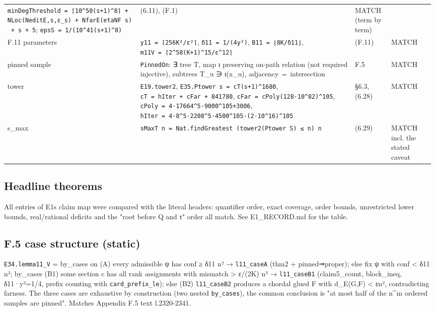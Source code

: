 \documentclass[
]{article}
\begin{document}
{\begin{longtable}[]{@{}llll@{}}
\texttt{minDegThreshold\ =\ ⌈10\^{}50(s+1)\^{}8⌉\ +\ NLoc(NeditE,s,ε\_s)\ +\ NfarE(etaNF\ s)\ +\ s\ +\ 5};
\texttt{epsS\ =\ 1/(10\^{}41(s+1)\^{}8)} & (6.11), (F.1) & MATCH (term
by term) \\
F.11 parameters & \texttt{y11\ =\ ⌈256K²/ε²⌉}, \texttt{δ11\ =\ 1/(4y²)},
\texttt{B11\ =\ ⌊8K/δ11⌋},
\texttt{m11V\ =\ ⌈2\^{}58(K+1)\^{}15/ε\^{}12⌉} & (F.11) & MATCH \\
pinned sample & \texttt{PinnedOn}: ∃ tree T, map ι preserving on-path
relation (not required injective), subtrees T\_u ∋ ι(x\_u), adjacency ⇔
intersection & F.5 & MATCH \\
tower & \texttt{E19.tower2}, \texttt{E35.Ptower\ s\ =\ cT(s+1)\^{}1680},
\texttt{cT\ =\ hIter\ +\ cFar\ +\ 841780},
\texttt{cFar\ =\ cPoly(128·10\^{}82)\^{}105},
\texttt{cPoly\ =\ 4·17664\^{}5·9000\^{}105+3006},
\texttt{hIter\ =\ 4·8\^{}5·2208\^{}5·4500\^{}105·(2·10\^{}16)\^{}105} &
§6.3, (6.28) & MATCH \\
s\_max &
\texttt{sMaxT\ n\ =\ Nat.findGreatest\ (tower2(Ptower\ S)\ ≤\ n)\ n} &
(6.29) & MATCH incl. the stated caveat \\
\end{longtable}
}

\subsection{Headline theorems}\label{headline-theorems}

All entries of E1\textquotesingle s claim map were compared with the
literal headers: quantifier order, exact coverage, order bounds,
unrestricted lower bounds, real/rational deficits and the "root before Q
and τ" order all match. See E1\_RECORD.md for the table.

\subsection{F.5 case structure (static)}\label{f5-case-structure-static}

\texttt{E34.lemma11\_V} = by\_cases on (A) every admissible ψ has conf ≥
δ11 n² → \texttt{l11\_caseA} (thm2 + pinned⇒proper); else fix ψ with
conf \textless{} δ11 n²; by\_cases (B1) some section c has all rank
assignments with mismatch \textgreater{} ε/(2K) n² →
\texttt{l11\_caseB1} (claim5\_count, block\_ineq, δ11·y²=1/4, prefix
counting with \texttt{card\_prefix\_le}); else (B2) \texttt{l11\_caseB2}
produces a chordal glued F with d\_E(G,F) \textless{} εn², contradicting
farness. The three cases are exhaustive by construction (two nested
\texttt{by\_cases}), the common conclusion is "at most half of the
n\^{}m ordered samples are pinned". Matches Appendix F.5 text
l.2320-2341.
\end{document}
